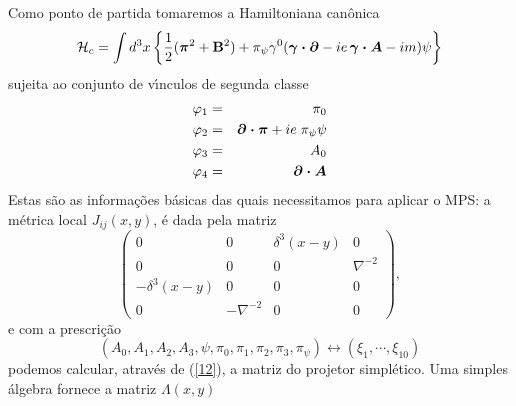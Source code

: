 \documentclass[a4paper,thmsa,12pt]{report}
\begin{document}
Como ponto de partida tomaremos a Hamiltoniana can\^{o}nica 
\begin{equation}
\mathcal{H}_c=\int d^{3}x\left\{ \frac{1}{2}(\boldmath\mbox{$\pi$}^{2}+\mathbf{B}%
^{2})+\pi _{\psi }\gamma ^{0}(\mbox{\boldmath$\gamma \cdot \partial$}-ie\,\mbox{\boldmath$\gamma
\cdot A$}-im)\psi \right\}
\label{301}
\end{equation}
sujeita ao conjunto de v\'{\i}nculos de segunda classe 
\begin{eqnarray}
\varphi _{1} &=&\pi _{0}  \label{302.a} \\
\varphi _{2} &=& \mbox{\boldmath$\partial \cdot \pi$}+ie\;\pi _{\psi }\psi \label{302.b} \\
\varphi _{3} &=&A_{0}  \label{302.c} \\
\varphi _{4} &=& \mbox{\boldmath$\partial \cdot A$} \label{302.d}
\end{eqnarray}
Estas s\~{a}o as informa\c{c}\~{o}es b\'{a}sicas das quais necessitamos para
aplicar o MPS: a m\'{e}trica local $J_{ij}\left( x,y\right) $, \'{e} dada
pela matriz 
\begin{equation}
\left( 
\begin{array}{cccc}
0 & 0 & \delta ^{3}(x-y) & 0 \\ 
0 & 0 & 0 & \nabla ^{-2} \\ 
-\delta ^{3}(x-y) & 0 & 0 & 0 \\ 
0 & -\nabla ^{-2} & 0 & 0
\end{array}
\right) ,  \label{303}
\end{equation}
e com a prescri\c{c}\~{a}o 
\begin{equation}
\left( A_{0},A_{1},A_{2},A_{3},\psi ,\pi _{0},\pi _{1},\pi _{2},\pi _{3},\pi
_{\psi }\right) \longleftrightarrow \left( \xi _{1},\cdots,\xi _{10}\right)
\label{304}
\end{equation}
podemos calcular, atrav\'{e}s de (\ref{12}), a matriz do projetor
simpl\'{e}tico. Uma simples \'{a}lgebra fornece  a matriz $\Lambda(x,y)$
\end{document}
